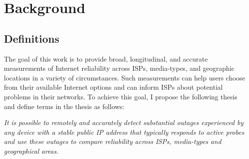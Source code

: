 
\section{Background}
\label{sec:related}



\subsection{Definitions}

The goal of this work is to provide broad, longitudinal, and accurate measurements of
Internet reliability across ISPs, media-types, and geographic
locations in a variety of circumstances. Such measurements can help
users choose from their available Internet options and can inform ISPs
about potential problems in their networks. To achieve this goal, I
propose the following thesis and define terms in the thesis as follows:

\emph{It is possible to remotely and accurately detect substantial outages
  experienced by any device with a stable public IP address that typically
  responds to active probes and use these outages to compare
  reliability across ISPs, media-types and geographical areas.}


